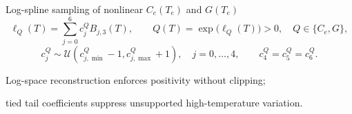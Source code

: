 \documentclass[aspectratio=169,10pt]{beamer}
\begin{document}
\begin{frame}[t]{Log-spline sampling of nonlinear \(C_e(T_e)\) and \(G(T_e)\)}
  \vspace{-0.30cm}
  \scriptsize
  \[
    \ell_Q(T)=\sum_{j=0}^{6}c_j^Q B_{j,3}(T),
    \qquad
    Q(T)=\exp\!\bigl(\ell_Q(T)\bigr)>0,
    \quad Q\in\{C_e,G\},
  \]
  \vspace{-0.10cm}
  \[
    c_j^Q\sim\mathcal U(c_{j,\min}^Q-1,c_{j,\max}^Q+1),
    \quad j=0,\ldots,4,
    \qquad
    c_4^Q=c_5^Q=c_6^Q.
  \]
  \vspace{-0.34cm}
  \begin{center}
    \color{GVSlate}Log-space reconstruction enforces positivity without clipping;\par
    tied tail coefficients suppress unsupported high-temperature variation.
  \end{center}
  \vspace{-0.30cm}
  \begin{center}
  \end{center}
\end{frame}
\end{document}
